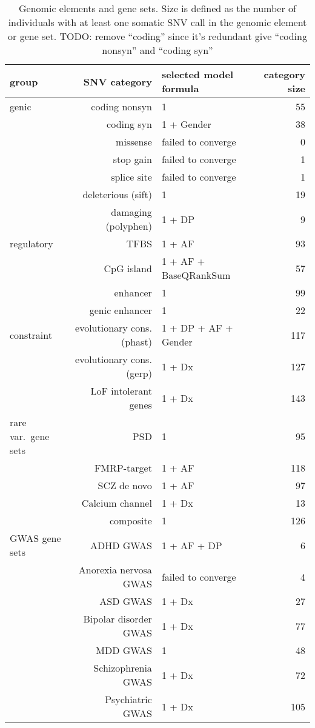\documentclass[letterpaper]{article}
\begin{document}
\begin{table}
\begin{tabular}{lrlr}
group & SNV category & selected model formula & category size \\
\hline
\hline
genic & coding nonsyn & 1 & 55 \\
& coding syn & 1 + Gender & 38 \\
& missense & failed to converge & 0 \\
& stop gain & failed to converge & 1 \\
& splice site & failed to converge & 1 \\
& deleterious (sift) & 1 & 19 \\
& damaging (polyphen) & 1 + DP & 9 \\
\hline
regulatory & TFBS & 1 + AF & 93 \\
& CpG island & 1 + AF + BaseQRankSum & 57 \\
& enhancer & 1 & 99 \\
& genic enhancer & 1 & 22 \\
\hline
constraint & evolutionary cons. (phast) & 1 + DP + AF + Gender & 117 \\
& evolutionary cons. (gerp) & 1 + Dx & 127 \\
& LoF intolerant genes & 1 + Dx & 143 \\
\hline
rare var.~gene sets & PSD & 1 & 95 \\
& FMRP-target & 1 + AF & 118 \\
& SCZ de novo & 1 + AF & 97 \\
& Calcium channel & 1 + Dx & 13 \\
& composite & 1 & 126 \\
\hline
GWAS gene sets & ADHD GWAS & 1 + AF + DP & 6 \\
& Anorexia nervosa GWAS & failed to converge & 4 \\
& ASD GWAS & 1 + Dx & 27 \\
& Bipolar disorder GWAS & 1 + Dx & 77 \\
& MDD GWAS & 1 & 48 \\
& Schizophrenia GWAS & 1 + Dx & 72 \\
& Psychiatric GWAS & 1 + Dx & 105 \\
\end{tabular}
\caption{
Genomic elements and gene sets.  Size is defined as the number of
individuals with at least one somatic SNV call in the genomic element
or gene set. TODO: remove ``coding'' since it's redundant give ``coding
nonsyn'' and ``coding syn''
}
\label{tab:modsel}
\end{table}
\end{document}
